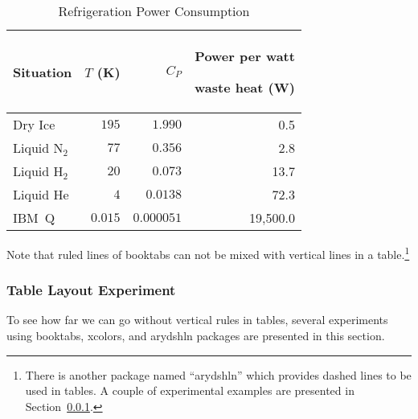 \begin{table}[tbhp]
\renewcommand*{\arraystretch}{1.2}\centering\small
\begin{tabular}{lrrr}\toprule
Situation
	& $T$ (K)
		& $C_P$	& \parbox[b]{.75in}{\raggedleft Power per watt\par waste heat (W)} \\
\midrule
Dry Ice
	& $195$
		& $1.990$
			& 0.5 \\
Liquid N$_2$
	& $77$
		& $0.356$
			& 2.8 \\
Liquid H$_2$
	& $20$
		& $0.073$
			& 13.7 \\
Liquid He
	& $4$
		& $0.0138$
			& 72.3 \\
IBM~Q	& $0.015$
		& $0.000051$
			& 19,500.0 \\
\bottomrule
\end{tabular}
\caption{Refrigeration Power Consumption}
\label{tab:app:styleguide:Refrigeration Power Consumption}
\end{table}

Note that ruled lines of booktabs can not be mixed with
vertical lines in a table.\footnote{
  There is another package named ``arydshln'' which provides dashed lines
  to be used in tables. A couple of experimental examples are presented in
  Section~\ref{sec:app:styleguide:Table Layout Experiment}.
}

\subsubsection{Table Layout Experiment}
\label{sec:app:styleguide:Table Layout Experiment}

To see how far we can go without vertical rules in tables,
several experiments using booktabs, xcolors, and arydshln packages
are presented in this section.

